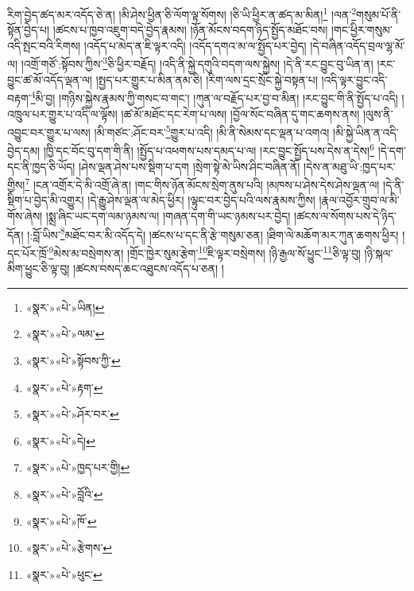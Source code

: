 རིག་བྱེད་ཚད་མར་འདོད་ཅེ་ན། །མི་ཤེས་ཕྱིན་ཅི་ལོག་ལྟ་སོགས། །ཅི་ཡི་ཕྱིར་ན་ཚད་མ་མིན།\footnote{«སྣར་»«པེ་»ཡིན།} །ལན་\footnote{«སྣར་»«པེ་»ལམ་}གསུམ་པོ་ནི་སྟོན་བྱེད་པ། །ཚངས་པ་ཁྱབ་འཇུག་བདེ་བྱེད་རྣམས། །ཉོན་མོངས་བདག་ཉིད་སྤྱོད་མཐོང་བས། །གང་ཕྱིར་གསུམ་འདི་སྤང་བའི་རིགས། །འདོད་པ་མེད་ན་ཇི་ལྟར་འདི། །འདོད་དགའ་མ་ལ་སྤྱོད་པར་བྱེད། །དེ་བཞིན་འདོད་བྲལ་ལྷ་མོ་ལ། །འགྲོ་གཙོ་:སྟོབས་ཀྱིས་\footnote{«སྣར་»«པེ་»སྟོབས་ཀྱི་}ཅི་ཕྱིར་བརྗོད། །འདི་ནི་སྐྱེ་དགུའི་བདག་ལས་སྐྱེས། །དེ་ནི་རང་བྱུང་བུ་ཡིན་ན། །རང་བྱུང་ཚ་མོ་འདོད་ལྡན་ལ། །སྤྱད་པར་གྱུར་པ་མིན་ནམ་ཅི། །རིག་ལས་དྲང་སྲོང་སྐྱེ་བསྟན་པ། །འདི་ལྟར་བྱུང་འདི་བརྟག་\footnote{«སྣར་»«པེ་»རྟག་}མི་བྱ། །གཉིས་སྐྱེས་རྣམས་ཀྱི་གསང་བ་གང་། །ཀུན་ལ་བརྗོད་པར་བྱ་བ་མིན། །རང་བྱུང་གི་ནི་སྤྱོད་པ་འདི། །འཁྲུལ་པར་གྱུར་པ་འདི་ལ་ལྟོས། །ཚ་མོ་མཐོང་དང་རེག་པ་ལས། །བྱོལ་སོང་བཞིན་དུ་གང་ཆགས་ནས། །ལུས་ནི་འབྱུང་བར་གྱུར་པ་ལས། །མི་གཙང་:ཤོང་བར་\footnote{«སྣར་»«པེ་»ཤོར་བར་}གྱུར་པ་འདི། །མི་ནི་སེམས་དང་ལྡན་པ་འགའ། །མི་སྐྱེ་ཡིན་ན་འདི་བྱེད་དམ། །ཁྱི་དང་བོང་བུ་དག་གི་ནི། །སྤྱོད་པ་འཕགས་པས་དམད་པ་ལ། །རང་བྱུང་སྤྱོད་པས་དེས་ན་དེས།\footnote{«སྣར་»«པེ་»དེ།} །དེ་དག་དང་ནི་ཁྱད་ཅི་ཡོད། །ཤེས་ལྡན་ཤེས་པས་སྡིག་པ་དག །སྲེག་སྟེ་མེ་ཡིས་ཤིང་བཞིན་ནོ། །དེས་ན་མཐུ་ཡི་:ཁྱད་པར་གྱིས།\footnote{«སྣར་»«པེ་»ཁྱད་པར་གྱི།} །ངན་འགྲོར་དེ་མི་འགྲོ་ཞེ་ན། །གང་གིས་ཉོན་མོངས་སྲེག་ནུས་པའི། །མཁས་པ་ཤེས་དེས་ཤེས་ལྡན་ལ། །དེ་ནི་སྡིག་པ་བྱེད་མི་འགྱུར། །དེ་རྒྱུ་ཤེས་ལྡན་ལ་མེད་ཕྱིར། །ལྟུང་བར་བྱེད་པའི་ལས་རྣམས་ཀྱིས། །རྣལ་འབྱོར་གྲུབ་ལ་མི་གོས་ཞེས། །སྨྲ་ཞིང་ཡང་དག་ལམ་ཉམས་ལ། །གཞན་དག་གི་ཡང་ཉམས་པར་བྱེད། །ཚངས་ལ་སོགས་པས་དེ་ཉིད་དོན། །:བློ་ཡིས་\footnote{«སྣར་»«པེ་»བློའི་}མཐོང་བར་མི་འདོད་དེ། །ཚངས་པ་དང་ནི་རྩེ་གསུམ་ཅན། །ཐིག་ལེ་མཆོག་མར་ཀུན་ཆགས་ཕྱིར། །དང་པོར་ཁྲོ་\footnote{«སྣར་»«པེ་»ཁོ་}མེས་མ་བསྲེགས་ན། །གྲོང་ཁྱེར་སུམ་རྩེག་\footnote{«སྣར་»«པེ་»རྩེགས་}ཇི་ལྟར་བསྲེགས། །ཉི་རྒྱལ་སོ་ཕྱུང་\footnote{«སྣར་»«པེ་»ཕུང་}ཅི་ལྟ་བུ། །ཉི་སྐལ་མིག་ཕྱུང་ཅི་ལྟ་བུ། །ཚངས་བསད་ཆང་འཐུངས་འདོད་པ་ཅན། །
